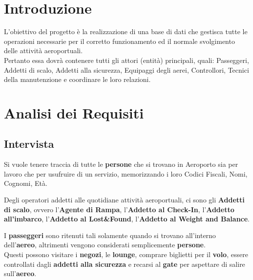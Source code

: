 
\newpage

\section{Introduzione}

\textsf{\small L'obiettivo del progetto è la realizzazione di una base di dati che gestisca tutte le operazioni necessarie per il corretto funzionamento ed il normale svolgimento delle attività aeroportuali.}\\
\textsf{\small Pertanto essa dovrà contenere tutti gli attori (entità) principali, quali: Passeggeri, Addetti di scalo, Addetti alla sicurezza, Equipaggi degli aerei, Controllori, Tecnici della manutenzione e coordinare le loro relazioni.}\\


\section{Analisi dei Requisiti}

\subsection{Intervista}



\textsf{\small Si vuole tenere traccia di tutte le \textbf{persone} che si trovano in Aeroporto sia per lavoro che per usufruire di un servizio, memorizzando i loro Codici Fiscali, Nomi, Cognomi, Età.}\break %

\textsf{\small Degli operatori addetti alle quotidiane attività aeroportuali, ci sono gli \textbf{Addetti di scalo}, ovvero l'\textbf{Agente di Rampa}, l'\textbf{Addetto al Check-In}, l'\textbf{Addetto all'imbarco}, l'\textbf{Addetto al Lost\&Found}, l'\textbf{Addetto al Weight and Balance}.}\break


\textsf{\small I \textbf{passeggeri} sono ritenuti tali solamente quando si trovano all'interno dell'\textbf{aereo}, altrimenti vengono considerati semplicemente \textbf{persone}.}\\
\textsf{\small Questi possono visitare i \textbf{negozi}, le \textbf{lounge}, comprare biglietti per il \textbf{volo}, essere controllati dagli \textbf{addetti alla sicurezza} e recarsi al \textbf{gate} per aspettare di salire sull'\textbf{aereo}.}\break

